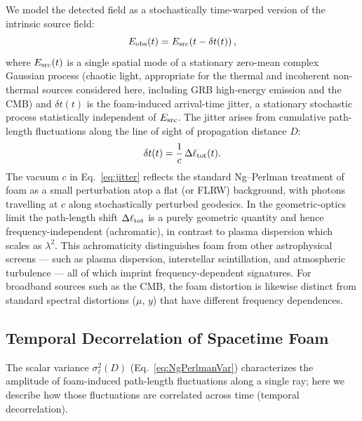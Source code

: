 \documentclass[aps,prd,onecolumn,amsmath,amssymb]{revtex4-2}
\begin{document}
We model the detected field as a stochastically time-warped version of the
intrinsic source field:
\begin{equation}
  E_{\rm obs}(t) = E_{\rm src}\!\left(t - \delta t(t)\right),
  \label{eq:Eobs}
\end{equation}
where $E_{\rm src}(t)$ is a single spatial mode of a stationary zero-mean
complex Gaussian process (chaotic light, appropriate for the thermal and incoherent
non-thermal sources considered here, including GRB high-energy
emission and the CMB) and $\delta t(t)$ is the foam-induced
arrival-time jitter, a stationary stochastic process statistically independent
of $E_{\rm src}$.
The jitter arises from cumulative path-length fluctuations along the
line of sight of propagation distance $D$:
\begin{equation}
  \delta t(t) = \frac{1}{c}\,\Delta\ell_{\rm tot}(t).
  \label{eq:jitter}
\end{equation}
The vacuum $c$ in Eq.~\eqref{eq:jitter} reflects the standard
Ng--Perlman treatment of foam as a small perturbation atop a flat
(or FLRW) background, with photons travelling at $c$ along
stochastically perturbed geodesics.
In the geometric-optics limit the path-length shift $\Delta\ell_{\rm tot}$
is a purely geometric quantity and hence frequency-independent (achromatic),
in contrast to plasma dispersion which scales as $\lambda^2$.
This achromaticity distinguishes foam from other astrophysical screens
--- such as plasma dispersion, interstellar scintillation, and atmospheric
turbulence --- all of which imprint frequency-dependent signatures.
For broadband sources such as the CMB, the foam distortion is likewise
distinct from standard spectral distortions ($\mu$, $y$) that have
different frequency dependences. 

\subsection{Temporal Decorrelation of Spacetime Foam}
\label{sec:Calpha_origin}

The scalar variance $\sigma_\ell^2(D)$ (Eq.~\eqref{eq:NgPerlmanVar})
characterizes the amplitude of foam-induced path-length fluctuations along
a single ray; here we describe how those fluctuations are correlated
across time (temporal decorrelation).
\end{document}
